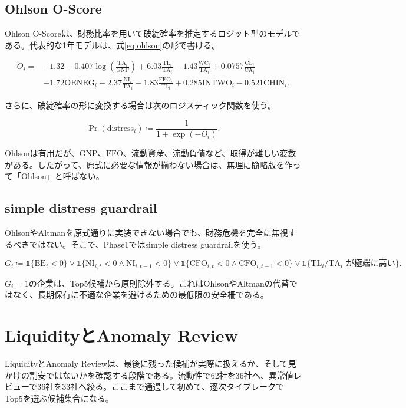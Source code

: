\documentclass[11pt,a4paper]{article}
\newcommand{\BE}{\mathrm{BE}}
\newcommand{\NI}{\mathrm{NI}}
\newcommand{\TA}{\mathrm{TA}}
\newcommand{\TL}{\mathrm{TL}}
\newcommand{\CFO}{\mathrm{CFO}}
\newcommand{\WC}{\mathrm{WC}}
\newcommand{\ind}{\mathbb{1}}
\begin{document}
\subsection{Ohlson O-Score}

Ohlson O-Scoreは、財務比率を用いて破綻確率を推定するロジット型のモデルである。代表的な1年モデルは、式\eqref{eq:ohlson}の形で書ける。

\begin{align}
O_i ={}& -1.32 -0.407\log\!\left(\frac{\TA_i}{\mathrm{GNP}}\right)
+6.03\frac{\TL_i}{\TA_i}
-1.43\frac{\WC_i}{\TA_i}
+0.0757\frac{\mathrm{CL}_i}{\mathrm{CA}_i}
\nonumber\\
&-1.72\mathrm{OENEG}_i
-2.37\frac{\NI_i}{\TA_i}
-1.83\frac{\mathrm{FFO}_i}{\TL_i}
+0.285\mathrm{INTWO}_i
-0.521\mathrm{CHIN}_i.
\label{eq:ohlson}
\end{align}

さらに、破綻確率の形に変換する場合は次のロジスティック関数を使う。

\begin{equation}
\Pr(\mathrm{distress}_i) \coloneqq \frac{1}{1+\exp(-O_i)}.
\label{eq:ohlson-prob}
\end{equation}

Ohlsonは有用だが、$\mathrm{GNP}$、$\mathrm{FFO}$、流動資産、流動負債など、取得が難しい変数がある。したがって、原式に必要な情報が揃わない場合は、無理に簡略版を作って「Ohlson」と呼ばない。

\subsection{simple distress guardrail}

OhlsonやAltmanを原式通りに実装できない場合でも、財務危機を完全に無視するべきではない。そこで、Phase1ではsimple distress guardrailを使う。

\begin{equation}
G_i \coloneqq \ind\{\BE_i<0\}
\lor \ind\{\NI_{i,t}<0 \land \NI_{i,t-1}<0\}
\lor \ind\{\CFO_{i,t}<0 \land \CFO_{i,t-1}<0\}
\lor \ind\{\TL_i/\TA_i \text{ が極端に高い}\}.
\label{eq:guardrail}
\end{equation}

$G_i=1$の企業は、Top5候補から原則除外する。これはOhlsonやAltmanの代替ではなく、長期保有に不適な企業を避けるための最低限の安全柵である。

\clearpage
\section{LiquidityとAnomaly Review}
\begin{keybox}
LiquidityとAnomaly Reviewは、最後に残った候補が実際に扱えるか、そして見かけの割安ではないかを確認する段階である。流動性で62社を36社へ、異常値レビューで36社を33社へ絞る。ここまで通過して初めて、逐次タイブレークでTop5を選ぶ候補集合になる。
\end{keybox}
\end{document}
